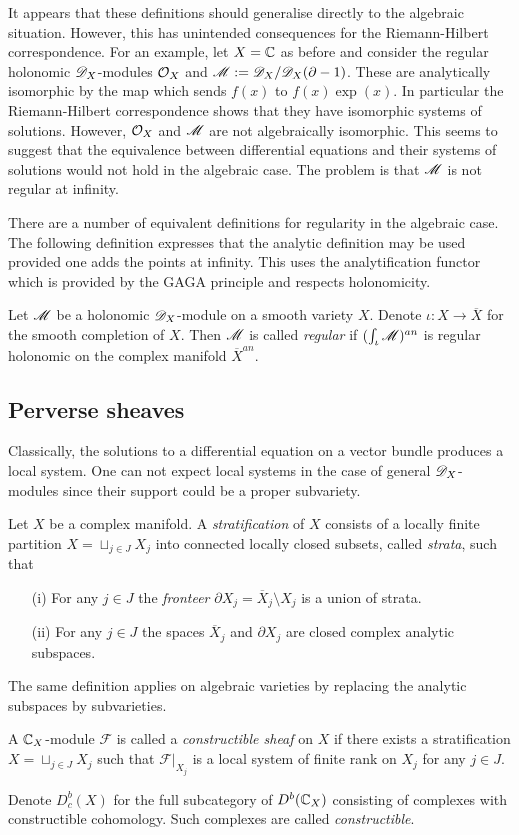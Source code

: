 It appears that these definitions should generalise directly to the algebraic situation.
However, this has unintended consequences for the Riemann-Hilbert correspondence.
For an example, let $X = \mathbb{C}$ as before and consider the regular holonomic $\mathscr{D}_X$-modules $\mathcal{O}_X$ and $\mathscr{M} := \mathscr{D}_X/\mathscr{D}_X(\partial - 1)$.
These are analytically isomorphic by the map which sends $f(x)$ to $f(x)\exp(x)$.
In particular the Riemann-Hilbert correspondence shows that they have isomorphic systems of solutions.
However, $\mathcal{O}_X$ and $\mathscr{M}$ are not algebraically isomorphic.
This seems to suggest that the equivalence between differential equations and their systems of solutions would not hold in the algebraic case.
The problem is that $\mathscr{M}$ is not regular at infinity.

There are a number of equivalent definitions for regularity in the algebraic case.
The following definition expresses that the analytic definition may be used provided one adds the points at infinity.
This uses the analytification functor which is provided by the GAGA principle and respects holonomicity.
\begin{definition}
  Let $\mathscr{M}$ be a holonomic $\mathscr{D}_X$-module on a smooth variety $X$.
  Denote $\iota:X \to \overline{X}$ for the smooth completion of $X$.
  Then $\mathscr{M}$ is called {\it regular} if $(\int_\iota \mathscr{M})^{an}$ is regular holonomic on the complex manifold $\overline{X}^{an}$.
\end{definition}
\subsection{Perverse sheaves}
  Classically, the solutions to a differential equation on a vector bundle produces a local system.
  One can not expect local systems in the case of general $\mathscr{D}_X$-modules since their support could be a proper subvariety.
  \begin{definition}
    Let $X$ be a complex manifold. A {\it stratification} of $X$ consists of a locally finite partition $X  = \sqcup_{j\in J} X_j$ into connected locally closed subsets, called {\it strata}, such that
    \begin{enumerate}
      \item[(i)] For any $j\in J$ the {\it fronteer} $\partial X_j = \overline{X}_j\setminus X_j$ is a union of strata.
      \item[(ii)] For any $j\in J$ the spaces $\overline{X}_j$ and $\partial X_j$ are closed complex analytic subspaces.
    \end{enumerate}
  \end{definition}
  The same definition applies on algebraic varieties by replacing the analytic subspaces by subvarieties.
  \begin{definition}
     A $\mathbb{C}_X$-module $\mathcal{F}$ is called a {\it constructible sheaf} on $X$ if there exists a stratification $X = \sqcup_{j\in J}X_j$ such that $\mathcal{F}\vert_{X_j}$ is a local system of finite rank on $X_j$ for any $j\in J$.
  \end{definition}
  Denote $D^b_c(X)$ for the full subcategory of $D^b(\mathbb{C}_X)$ consisting of complexes with constructible cohomology.
  Such complexes are called {\it constructible}.


